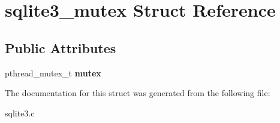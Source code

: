 \hypertarget{structsqlite3__mutex}{\section{sqlite3\-\_\-mutex Struct Reference}
\label{structsqlite3__mutex}
}
\subsection*{Public Attributes}
\begin{DoxyCompactItemize}
\item 
\hypertarget{structsqlite3__mutex_a6eef25bee73a3640dbbd052d707dbfdc}{pthread\-\_\-mutex\-\_\-t {\bfseries mutex}}\label{structsqlite3__mutex_a6eef25bee73a3640dbbd052d707dbfdc}

\end{DoxyCompactItemize}


The documentation for this struct was generated from the following file\-:\begin{DoxyCompactItemize}
\item 
sqlite3.\-c\end{DoxyCompactItemize}
